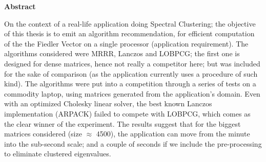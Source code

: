 \thispagestyle{plain}
\begin{center}

  \vspace{0.4cm}


  \vspace{0.9cm}
  \textbf{Abstract}
\end{center}

    On the context of a real-life application doing Spectral
    Clustering; the objective of this thesis is to emit an algorithm
    recommendation, for efficient 
    computation of the the Fiedler Vector on a single processor
    (application requirement). The algorithms considered were
    MRRR, Lanczos and LOBPCG; the first one is designed for dense
    matrices, hence not really a competitor here; but was 
    included for the sake of comparison (as the application currently
    uses a procedure of such kind). The algorithms were put into
    a competition through a series of tests on a commodity laptop, 
    using matrices generated from the application's domain. Even with
    an optimized Cholesky linear solver, the best known Lanczos
    implementation (ARPACK) failed to compete with LOBPCG, which comes
    as the clear winner of the experiment. The results suggest that
    for the biggest matrices considered (size $\approx$ 4500), the application can
    move from the minute into the sub-second scale; and a couple of seconds if we include the pre-processing to eliminate clustered eigenvalues.

